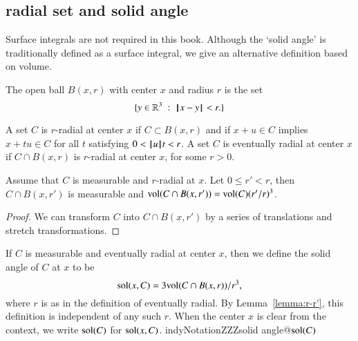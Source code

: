 \subsection{radial set and solid angle}\label{sec:solid}


Surface integrals are not required in this book.  Although
the `solid angle' is traditionally defined as a surface integral,
we give an alternative definition based on volume.


\begin{definition}  The open ball $B(x,r)$ with center $x$ and
radius $r$ is the set
    $$
    \{ y\in\mathbb{R}^3 \ :\  {\hskip0.1em|\hskip-0.15em|\hskip0.1em}x - y{\hskip0.1em|\hskip-0.15em|\hskip0.1em} < r.\}
    $$
\end{definition}



\begin{definition}[radial]
    A set $C$ is $r$-radial at center $x$ if  $C\subset B(x,r)$
    and if
        $x + u \in C$ implies
        $x + t u \in C$ for all $t$ satisfying $0 < {{\hskip0.1em|\hskip-0.15em|\hskip0.1em}u{\hskip0.1em|\hskip-0.15em|\hskip0.1em}} t < r$.
A set $C$ is eventually radial at center $x$ if $C\cap B(x,r)$ is
$r$-radial at center $x$, for some $r>0$.
\end{definition}

\begin{lemma}
Assume that $C$ is measurable and $r$-radial at $x$.  Let $0\le r'<r$,
then $C\cap B(x,r')$ is measurable and
${\operatorname{vol}}(C\cap B(x,r')) = {\operatorname{vol}}(C) (r'/r)^3$.
\end{lemma}

\begin{proof}  We can transform $C$ into $C\cap B(x,r')$ by
a series of translations and stretch transformations.
\end{proof}


\begin{definition}
If $C$ is measurable and eventually radial at center $x$, then we
define the solid angle of $C$ at $x$ to be
    $$
    {\operatorname{sol}}(x,C) = 3 {\operatorname{vol}}(C\cap B(x,r))/r^3,
    $$
where $r$ is as in the definition of eventually radial. 
By Lemma~\ref{lemma:r-r'}, this
definition is independent of any such $r$.  When the center $x$ is
clear from the context, we write ${\operatorname{sol}}(C)$ for
${\operatorname{sol}}(x,C)$.
indy{Notation}{ZZZsolid angle@${\operatorname{sol}}(C)$}
\end{definition}



